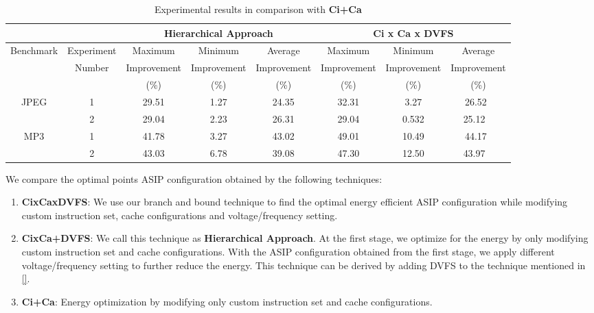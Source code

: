 \begin{center}
\begin{table*}[ht]
{
\begin{tabular}{|c|c|c|c|c|c|c|c|}
\hline
 &  &\multicolumn{3}{|c|}{\textbf{Hierarchical Approach}} &  \multicolumn{3}{|c|}{\textbf{Ci x Ca x DVFS}}\\
\hline
Benchmark&Experiment &Maximum&Minimum& Average&Maximum&Minimum& Average\\
& Number & Improvement & Improvement & Improvement & Improvement & Improvement & Improvement\\
& & (\%) & (\%) & (\%) & (\%) & (\%) & (\%)\\ 
\hline
\multirow{2}{*}{JPEG} & 1 & 29.51 & 1.27 & 24.35 & 32.31 & 3.27 & 26.52\ \\
& 2 & 29.04 & 2.23 & 26.31 & 29.04 & 0.532 & 25.12 \ \\
\hline
\multirow{2}{*}{MP3} & 1 & 41.78 & 3.27 & 43.02 & 49.01 & 10.49 & 44.17\ \\
& 2 & 43.03 & 6.78 & 39.08 & 47.30 & 12.50 & 43.97 \ \\
\hline
\end{tabular}
}
\hfill{}
\caption{Experimental results in comparison with \textbf{Ci+Ca}}
\label{tb:comparison}
\end{table*}
\end{center}


We compare the optimal points ASIP configuration obtained by the following techniques:
\begin{enumerate}
\item \textbf{CixCaxDVFS}: We use our branch and bound technique to find the optimal energy efficient ASIP configuration while modifying custom instruction set, cache configurations and voltage/frequency setting.
\item \textbf{CixCa+DVFS}: We call this technique as \textbf{Hierarchical Approach}. At the first stage, we optimize for the energy by only modifying custom instruction set and cache configurations. With the ASIP configuration obtained from the first stage, we apply different voltage/frequency setting to further reduce the energy. This technique can be derived by adding DVFS to the technique mentioned in \ref{}. 
\item \textbf{Ci+Ca}: Energy optimization by modifying only custom instruction set and cache configurations.
\end{enumerate}   

